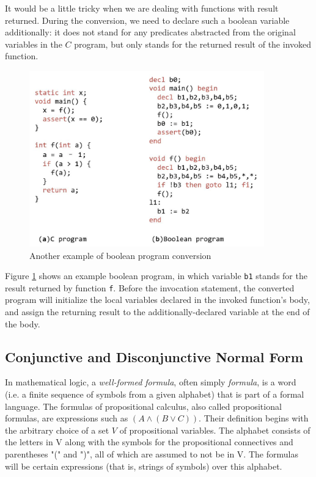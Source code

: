 It would be a little tricky when we are dealing with functions with result returned. During the conversion, we need to declare such a boolean variable additionally: it does not stand for any predicates abstracted from the original variables in the $C$ program, but only stands for the returned result of the invoked function.

\begin{figure}
\centering
\includegraphics[width=4in,height=3in]{img/Fig2-3.jpg}
\caption{Another example of boolean program conversion}
\label{fig:BPC_1}
\end{figure}

Figure \ref{fig:BPC_1} shows an example boolean program, in which variable \lstinline|b1| stands for the result returned by function \lstinline|f|.
Before the invocation statement, the converted program will initialize the local variables declared in the invoked function's body, and assign the returning result to the additionally-declared variable at the end of the body.

\subsection{Conjunctive and Disconjunctive Normal Form}
\label{section:CNF_DNF}
In mathematical logic, a \textit{well-formed formula}, often simply \textit{formula}, is a word (i.e. a finite sequence of symbols from a given alphabet) that is part of a formal language.
The formulas of propositional calculus, also called propositional formulas\cite{FOLaATP}, are expressions such as $(A \wedge (B \vee C))$. Their definition begins with the arbitrary choice of a set $V$ of propositional variables. The alphabet consists of the letters in V along with the symbols for the propositional connectives and parentheses "(" and ")", all of which are assumed to not be in V. The formulas will be certain expressions (that is, strings of symbols) over this alphabet.

